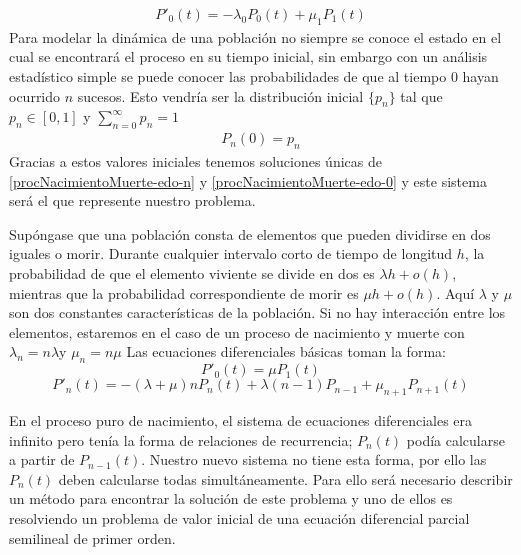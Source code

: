 \begin{eqnarray}
    P'_0(t)=-\lambda_0 P_0(t)+\mu_{1}P_{1}(t)
\label{procNacimientoMuerte-edo-0}
\end{eqnarray}
Para modelar la dinámica de una población no siempre se conoce el estado en el cual se encontrará el proceso en su tiempo inicial, sin embargo con un análisis estadístico simple se puede conocer las probabilidades de que al tiempo $0$ hayan ocurrido $n$ sucesos. Esto vendría ser la distribución inicial $\{p_n\}$ tal que $p_n\in [0,1]$ y $\sum_{n=0}^\infty p_n =1$
\begin{eqnarray}
    P_n(0)=p_n
\end{eqnarray}
Gracias a estos valores iniciales tenemos soluciones únicas de \ref{procNacimientoMuerte-edo-n} y \ref{procNacimientoMuerte-edo-0} y este sistema será el que represente nuestro problema.\\
\begin{Ejm}
Supóngase que una población consta de elementos que pueden dividirse en dos iguales o morir. Durante cualquier intervalo corto de tiempo de longitud $h$, la probabilidad de que el elemento viviente se divide en dos es $\lambda h+ o(h)$, mientras que la probabilidad correspondiente de morir es $\mu h + o(h)$. Aquí $\lambda$ y $\mu$ son dos constantes características de la población. Si no hay interacción entre los elementos, estaremos en el caso de un proceso de nacimiento y muerte con $\lambda_n=n \lambda$\lambda y $\mu_n =n \mu$
Las ecuaciones diferenciales básicas toman la forma:
$$P'_0(t)=\mu P_1(t)$$
$$P'_n(t)=-(\lambda+\mu)n P_n(t)+\lambda(n-1)P_{n-1}+\mu_{n+1}P_{n+1}(t)$$
\end{Ejm}
En el proceso puro de nacimiento, el sistema de ecuaciones diferenciales era infinito pero tenía la forma de relaciones de recurrencia; $P_n(t)$ podía calcularse a partir de $P_{n-1}(t)$. Nuestro nuevo sistema no tiene esta forma, por ello las $P_n(t)$ deben calcularse todas simultáneamente. Para ello será necesario describir un método para encontrar la solución de este problema y uno de ellos es resolviendo un problema de valor inicial de una ecuación diferencial parcial semilineal de primer orden.